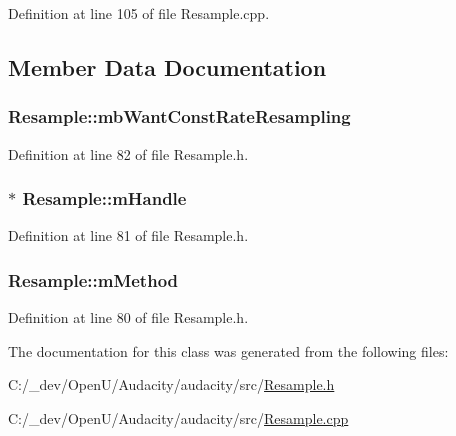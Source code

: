 Definition at line 105 of file Resample.\+cpp.



\subsection{Member Data Documentation}
\subsubsection[{\texorpdfstring{mb\+Want\+Const\+Rate\+Resampling}{mbWantConstRateResampling}}]{ Resample\+::mb\+Want\+Const\+Rate\+Resampling\hspace{0.3cm}{\ttfamily [protected]}}\hypertarget{class_resample_a1a66a9297181cbb32c0756b1b2c82fd1}{}\label{class_resample_a1a66a9297181cbb32c0756b1b2c82fd1}


Definition at line 82 of file Resample.\+h.

\subsubsection[{\texorpdfstring{m\+Handle}{mHandle}}]{$\ast$ Resample\+::m\+Handle\hspace{0.3cm}{\ttfamily [protected]}}\hypertarget{class_resample_ae81fd13c80c1a50c4b1f2564a40c50cf}{}\label{class_resample_ae81fd13c80c1a50c4b1f2564a40c50cf}


Definition at line 81 of file Resample.\+h.

\subsubsection[{\texorpdfstring{m\+Method}{mMethod}}]{ Resample\+::m\+Method\hspace{0.3cm}{\ttfamily [protected]}}\hypertarget{class_resample_aaa211164c846c3fb4821b58f752289e0}{}\label{class_resample_aaa211164c846c3fb4821b58f752289e0}


Definition at line 80 of file Resample.\+h.



The documentation for this class was generated from the following files\+:\begin{DoxyCompactItemize}
\item 
C\+:/\+\_\+dev/\+Open\+U/\+Audacity/audacity/src/\hyperlink{_resample_8h}{Resample.\+h}\item 
C\+:/\+\_\+dev/\+Open\+U/\+Audacity/audacity/src/\hyperlink{src_2resample_8cpp}{Resample.\+cpp}\end{DoxyCompactItemize}
